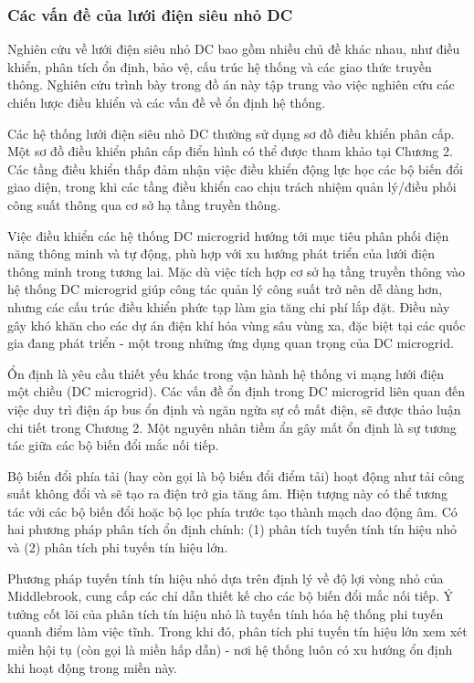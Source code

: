 \subsubsection{Các vấn đề của lưới điện siêu nhỏ DC}
Nghiên cứu về lưới điện siêu nhỏ DC bao gồm nhiều chủ đề khác nhau, như điều khiển, phân tích ổn định, bảo vệ, cấu trúc hệ thống và các giao thức truyền thông. Nghiên cứu trình bày trong đồ án này tập trung vào việc nghiên cứu các chiến lược điều khiển và các vấn đề về ổn định hệ thống.\par
Các hệ thống lưới điện siêu nhỏ DC thường sử dụng sơ đồ điều khiển phân cấp. Một sơ đồ điều khiển phân cấp điển hình có thể được tham khảo tại Chương 2. Các tầng điều khiển thấp đảm nhận việc điều khiển động lực học các bộ biến đổi giao diện, trong khi các tầng điều khiển cao chịu trách nhiệm quản lý/điều phối công suất thông qua cơ sở hạ tầng truyền thông. \par
Việc điều khiển các hệ thống DC microgrid hướng tới mục tiêu phân phối điện năng thông minh và tự động, phù hợp với xu hướng phát triển của lưới điện thông minh trong tương lai. Mặc dù việc tích hợp cơ sở hạ tầng truyền thông vào hệ thống DC microgrid giúp công tác quản lý công suất trở nên dễ dàng hơn, nhưng các cấu trúc điều khiển phức tạp làm gia tăng chi phí lắp đặt. Điều này gây khó khăn cho các dự án điện khí hóa vùng sâu vùng xa, đặc biệt tại các quốc gia đang phát triển - một trong những ứng dụng quan trọng của DC microgrid. \par
Ổn định là yêu cầu thiết yếu khác trong vận hành hệ thống vi mạng lưới điện một chiều (DC microgrid). Các vấn đề ổn định trong DC microgrid liên quan đến việc duy trì điện áp bus ổn định và ngăn ngừa sự cố mất điện, sẽ được thảo luận chi tiết trong Chương 2. Một nguyên nhân tiềm ẩn gây mất ổn định là sự tương tác giữa các bộ biến đổi mắc nối tiếp.\par
Bộ biến đổi phía tải (hay còn gọi là bộ biến đổi điểm tải) hoạt động như tải công suất không đổi và sẽ tạo ra điện trở gia tăng âm. Hiện tượng này có thể tương tác với các bộ biến đổi hoặc bộ lọc phía trước tạo thành mạch dao động âm. Có hai phương pháp phân tích ổn định chính: (1) phân tích tuyến tính tín hiệu nhỏ và (2) phân tích phi tuyến tín hiệu lớn. \par
Phương pháp tuyến tính tín hiệu nhỏ dựa trên định lý về độ lợi vòng nhỏ của Middlebrook, cung cấp các chỉ dẫn thiết kế cho các bộ biến đổi mắc nối tiếp. Ý tưởng cốt lõi của phân tích tín hiệu nhỏ là tuyến tính hóa hệ thống phi tuyến quanh điểm làm việc tĩnh. Trong khi đó, phân tích phi tuyến tín hiệu lớn xem xét miền hội tụ (còn gọi là miền hấp dẫn) - nơi hệ thống luôn có xu hướng ổn định khi hoạt động trong miền này. \par
